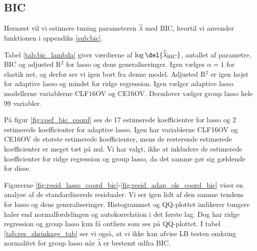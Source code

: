 \subsection{BIC}
Hernæst vil vi estimere tuning parameteren \(\widehat{\lambda}\) med BIC, hvortil vi anvender funktionen i appendiks \ref{sub:bic}.

Tabel \ref{tab:bic_lambda} giver værdierne af $\log \del{ \widehat{\lambda}_\text{BIC}}$, antallet af parametre, BIC og adjusted R$^2$ for lasso og dens generaliseringer. 
Igen vælges \(\alpha = 1\) for elastik net, og derfor ser vi igen bort fra denne model.
Adjusted R$^2$ er igen højst for adaptive lasso og mindst for ridge regression. 
Igen vælger adaptive lasso modellerne variablerne \textcolor{blue3}{CLF16OV} og \textcolor{blue3}{CE16OV}.
Derudover vælger group lasso hele 99 variabler. 



På figur \ref{fig:coef_bic_coord} ses de 17 estimerede koefficienter for lasso og 2 estimerede koefficienter for adaptive lasso.
Igen har variablerne \textcolor{blue3}{CLF16OV} og \textcolor{blue3}{CE16OV} de største estimerede koefficienter, mens de resterende estimerede koefficienter er meget tæt på nul. 
Vi har valgt, ikke at inkludere de estimerede koefficienter for ridge regression og group lasso, da det samme gør sig gældende for disse.


Figurerne \ref{fig:resid_lasso_coord_bic}-\ref{fig:resid_adap_ols_coord_bic} viser en analyse af de standardiserede residualer.
Vi ser igen lidt af den samme tendens for lasso og dens generaliseringer. 
Histogrammet og QQ-plottet indikerer tungere haler end normalfordelingen og autokorrelation i det første lag. 
Dog har ridge regression og group lasso kun få outliers som ses på QQ-plottet. 
I tabel \ref{tab:res_shrinkage_tab} ser vi også, at vi ikke kan afvise LB testen omkring normalitet for group lasso når $\widehat{\lambda}$ er bestemt udfra BIC. 

\newpage
